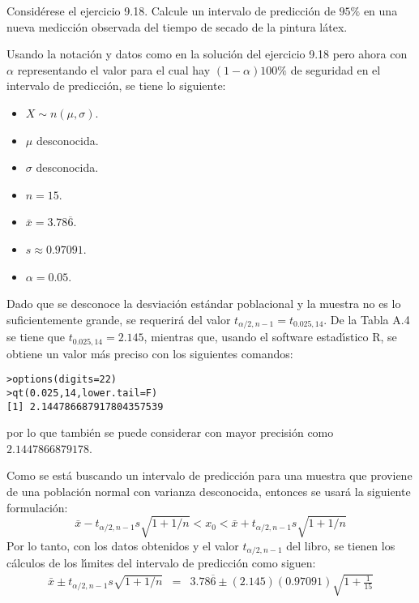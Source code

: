 \begin{enunciado}
 Consid\'erese el ejercicio 9.18. Calcule un intervalo de predicci\'on de $95\%$ en una nueva medicci\'on observada del tiempo de secado de la pintura l\'atex.
\end{enunciado}

\begin{solucion}
 Usando la notaci\'on y datos como en la soluci\'on del ejercicio 9.18 pero ahora con $\alpha$ representando el valor para el cual hay $(1-\alpha)100\%$ de seguridad en el intervalo de predicci\'on, se tiene lo siguiente:
 \begin{itemize}
  \item $X\sim n(\mu, \sigma)$.
  \item $\mu$ desconocida.
  \item $\sigma$ desconocida.
  \item $n=15$.
  \item $\bar{x} = 3.78\overline{6}$.
  \item $s\approx 0.97091$.
  \item $\alpha = 0.05$.
 \end{itemize}
 Dado que se desconoce la desviaci\'on est\'andar poblacional y la muestra no es lo suficientemente grande, se requerir\'a del valor $t_{\alpha/2,n-1} = t_{0.025,14}$. De la Tabla A.4 se tiene que $t_{0.025,14} = 2.145$, mientras que, usando el software estad\'{\i}stico R, se obtiene un valor m\'as preciso con los siguientes comandos:
 \begin{verbatim}
>options(digits=22)
>qt(0.025,14,lower.tail=F)
[1] 2.144786687917804357539
 \end{verbatim}
 \vspace{-0.5cm}
 por lo que tambi\'en se puede considerar con mayor precisi\'on como $2.1447866879178$.
 \par 
 Como se est\'a buscando un intervalo de predicci\'on para una muestra que proviene de una poblaci\'on normal con varianza desconocida, entonces se usar\'a la siguiente formulaci\'on:
 \begin{equation*}
  \bar{x}-t_{\alpha/2,n-1}s\sqrt{1+1/n} < x_0 < \bar{x}+t_{\alpha/2,n-1}s\sqrt{1+1/n}
 \end{equation*}
 Por lo tanto, con los datos obtenidos y el valor $t_{\alpha/2,n-1}$ del libro, se tienen los c\'alculos de los l\'{\i}mites del intervalo de predicci\'on como siguen:
 \begin{eqnarray*}
  \bar{x} \pm t_{\alpha/2,n-1}s\sqrt{1+1/n} 
  & = & 3.78\overline{6} \pm (2.145)(0.97091)\sqrt{1 + \frac{1}{15}} 

\end{eqnarray*}
\end{solucion}
